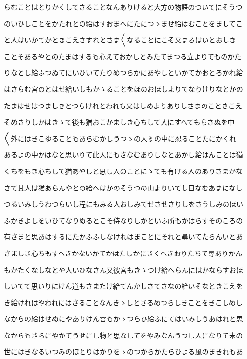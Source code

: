 \documentclass[a4paper,11pt,landscape]{ltjtarticle}
\begin{document}
らむことはとりかくしてさることなんありけると大方の物語のついてにそうつ
\par\medskip
のいひしことをかたれとの給はすおまへにたにつゝませ給はむことをましてこ
\par\medskip
と人はいかてかときこえさすれとさま〱なることにこそ又まろはいとおしき
\par\medskip
ことそあるやとのたまはするも心えておかしとみたてまつる立よりてものかた
\par\medskip
りなとし給ふつゐてにいひいてたりめつらかにあやしといかてかおとろかれ給
\par\medskip
はさらむ宮のとはせ給いしもかゝることをほのおほしよりてなりけりなとかの
\par\medskip
たまはせはつましきとつらけれとわれも又はしめよりありしさまのこときこえ
\par\medskip
そめさりしかはきゝて後も猶おこかましき心ちして人にすへてもらさぬを中
\par\medskip
〱外にはきこゆることもあらむかしうつゝの人〻の中に忍ることたにかくれ
\par\medskip
あるよの中かはなと思いりて此人にもさなむありしなとあかし給はんことは猶
\par\medskip
くちをもき心ちして猶あやしと思し人のことにゝても有ける人のありさまかな
\par\medskip
さて其人は猶あらんやとの給へはかのそうつの山よりいてし日なむあまになし
\par\medskip
つるいみしうわつらいし程にもみる人おしみてせさせさりしをさうしみのほい
\par\medskip
ふかきよしをいひてなりぬるとこそ侍なりしかといふ所もかはらすそのころの
\par\medskip
有さまと思あはするにたかふふしなけれはまことにそれと尋いてたらんいとあ
\par\medskip
さましき心ちもすへきかないかてかはたしかにきくへきおりたちて尋ありかん
\par\medskip
もかたくなしなとや人いひなさん又彼宮もきゝつけ給へらんにはかならすおほ
\par\medskip
しいてて思いりにけん道もさまたけ給てんかしさてさなの給いそなときこえを
\par\medskip
き給けれはやわれにはさることなんきゝしとさるめつらしきことをきこしめし
\par\medskip
なからの給はせぬにやありけん宮もかゝつらひ給ふにてはいみしうあはれと思
\par\medskip
なからもさらにやかてうせにし物と思なしてをやみなんうつし人になりて末の
\par\medskip
世にはきなるいつみのほとりはかりをゝのつからかたらひよる風のまきれもあ
\end{document}
